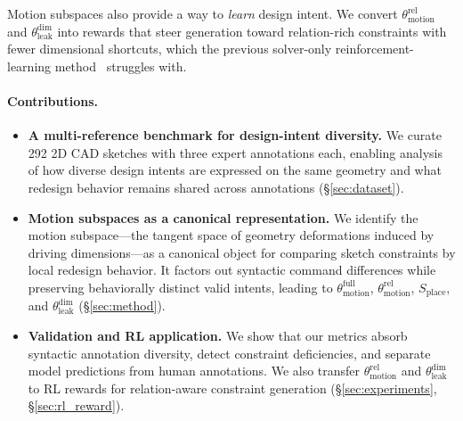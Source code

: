Motion subspaces also provide a way to \emph{learn} design intent. We convert $\theta_{\mathrm{motion}}^{\mathrm{rel}}$ and $\theta_{\mathrm{leak}}^{\mathrm{dim}}$ into rewards that steer generation toward relation-rich constraints with fewer dimensional shortcuts, which the previous solver-only reinforcement-learning method~\cite{casey2025aligning} struggles with.

\paragraph{Contributions.}
\begin{itemize}[leftmargin=*, itemsep=2pt, topsep=2pt]
    \item \textbf{A multi-reference benchmark for design-intent diversity.}
    We curate 292 2D CAD sketches with three expert annotations each, enabling analysis of how diverse design intents are expressed on the same geometry and what redesign behavior remains shared across annotations (\S\ref{sec:dataset}).

    \item \textbf{Motion subspaces as a canonical representation.}
    We identify the motion subspace---the tangent space of geometry deformations induced by driving dimensions---as a canonical object for comparing sketch constraints by local redesign behavior. It factors out syntactic command differences while preserving behaviorally distinct valid intents, leading to $\theta_{\mathrm{motion}}^{\mathrm{full}}$, $\theta_{\mathrm{motion}}^{\mathrm{rel}}$, $S_{\mathrm{place}}$, and $\theta_{\mathrm{leak}}^{\mathrm{dim}}$ (\S\ref{sec:method}).

    \item \textbf{Validation and RL application.}
    We show that our metrics absorb syntactic annotation diversity, detect constraint deficiencies, and separate model predictions from human annotations. We also transfer $\theta_{\mathrm{motion}}^{\mathrm{rel}}$ and $\theta_{\mathrm{leak}}^{\mathrm{dim}}$ to RL rewards for relation-aware constraint generation (\S\ref{sec:experiments}, \S\ref{sec:rl_reward}).
\end{itemize}
